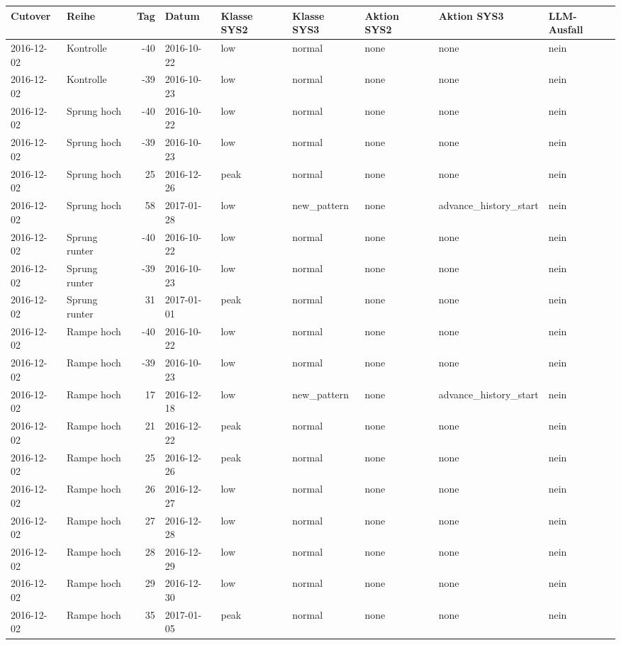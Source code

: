 \begin{tabular}{llrllllll}
\toprule
Cutover & Reihe & Tag & Datum & Klasse SYS2 & Klasse SYS3 & Aktion SYS2 & Aktion SYS3 & LLM-Ausfall \\
\midrule
2016-12-02 & Kontrolle & -40 & 2016-10-22 & low & normal & none & none & nein \\
2016-12-02 & Kontrolle & -39 & 2016-10-23 & low & normal & none & none & nein \\
2016-12-02 & Sprung hoch & -40 & 2016-10-22 & low & normal & none & none & nein \\
2016-12-02 & Sprung hoch & -39 & 2016-10-23 & low & normal & none & none & nein \\
2016-12-02 & Sprung hoch & 25 & 2016-12-26 & peak & normal & none & none & nein \\
2016-12-02 & Sprung hoch & 58 & 2017-01-28 & low & new\_pattern & none & advance\_history\_start & nein \\
2016-12-02 & Sprung runter & -40 & 2016-10-22 & low & normal & none & none & nein \\
2016-12-02 & Sprung runter & -39 & 2016-10-23 & low & normal & none & none & nein \\
2016-12-02 & Sprung runter & 31 & 2017-01-01 & peak & normal & none & none & nein \\
2016-12-02 & Rampe hoch & -40 & 2016-10-22 & low & normal & none & none & nein \\
2016-12-02 & Rampe hoch & -39 & 2016-10-23 & low & normal & none & none & nein \\
2016-12-02 & Rampe hoch & 17 & 2016-12-18 & low & new\_pattern & none & advance\_history\_start & nein \\
2016-12-02 & Rampe hoch & 21 & 2016-12-22 & peak & normal & none & none & nein \\
2016-12-02 & Rampe hoch & 25 & 2016-12-26 & peak & normal & none & none & nein \\
2016-12-02 & Rampe hoch & 26 & 2016-12-27 & low & normal & none & none & nein \\
2016-12-02 & Rampe hoch & 27 & 2016-12-28 & low & normal & none & none & nein \\
2016-12-02 & Rampe hoch & 28 & 2016-12-29 & low & normal & none & none & nein \\
2016-12-02 & Rampe hoch & 29 & 2016-12-30 & low & normal & none & none & nein \\
2016-12-02 & Rampe hoch & 35 & 2017-01-05 & peak & normal & none & none & nein \\

\end{tabular}
